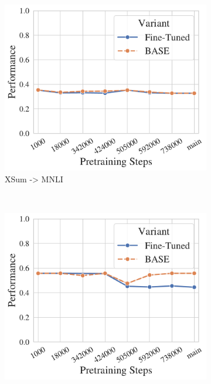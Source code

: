 \begin{figure}[t!]
\begin{subfigure}[b]{0.3\textwidth}
    \end{subfigure}%
    ~ 
    \begin{subfigure}[b]{0.3\textwidth}
    \includegraphics[width=\the\columnwidth]{figures/fig_files/cross-task/sft_evalmnli_matched-trainxsum.pdf}
        \caption{XSum -> MNLI}
    \end{subfigure}%
    \\
    \begin{subfigure}[b]{0.3\textwidth}
    \includegraphics[width=\the\columnwidth]{figures/fig_files/cross-task/sft_evalpaws-trainmnli.pdf}

\end{subfigure}
\end{figure}
